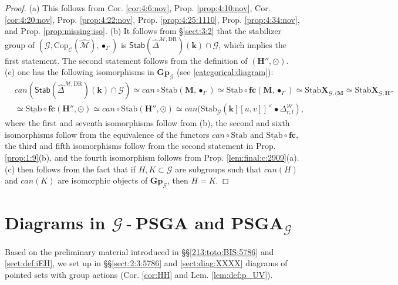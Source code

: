 \documentclass[10pt]{amsart}
\newcommand{\DR}{\mathrm{DR}}
\numberwithin{equation}{subsection}
\begin{document}
\begin{proof}
(a) This follows from Cor. \ref{cor:4:6:nov}, Prop. \ref{prop:4:10:nov}, Cor. \ref{cor:4:20:nov}, Prop. \ref{prop:4:22:nov}, Prop. \ref{prop:4:25:1110},
Prop. \ref{prop:4:34:nov}, and Prop. \ref{prop:missing:iso}. 
(b) It follows from §\ref{sect:3:2} that the stabilizer group of
$(\mathcal G,\mathrm{Cop}_{\mathcal C}(\hat{\mathcal M}),\bullet_\Gamma)$
is $\mathsf{Stab}(\hat\Delta^{\mathcal M,\DR})(\mathbf k)\cap \mathcal G$, which implies the first statement. The second 
statement follows from the definition of $(\mathbf{H''},\odot)$.      
(c) one has the following isomorphisms in $\mathbf{Gp}_{\mathcal G}$ (see \eqref{categorical:diagram}): 
\begin{align*}
    &
can(\mathsf{Stab}(\hat\Delta^{\mathcal M,\DR})(\mathbf k)\cap \mathcal G)
\simeq can\circ \mathrm{Stab}(\mathbf M,\bullet_\Gamma)\simeq
\underline{\mathrm{Stab}}\circ\mathbf f\mathbf c(\mathbf M,\bullet_\Gamma)
\simeq\underline{\mathrm{Stab}}\mathbf X_{\mathcal G,(\mathbf M}
\simeq \underline{\mathrm{Stab}}\mathbf X_{\mathcal G,\mathbf{H''}}
    \\&
\simeq \underline{\mathrm{Stab}}\circ\mathbf f\mathbf c(\mathbf{H''},\odot)    
\simeq can \circ \mathrm{Stab}(\mathbf{H''},\odot)\simeq can(\mathrm{Stab}_{\mathcal G}(
\mathbf k[[u,v]]^\times\bullet\Delta^{\mathcal W}_{r,l}
), 
\end{align*}
where the first and seventh isomorphisms follow from (b), the second and sixth isomorphisms follow from 
the equivalence of the functors $can\circ \mathrm{Stab}$ and 
$\underline{\mathrm{Stab}}\circ \mathbf f\mathbf c$, the third and fifth isomorphisms follow from the second statement in Prop. \ref{prop:1:9}(b), 
and the fourth isomorphism follows from Prop. \ref{lem:final:c:2909}(a). (c) then follows from the
fact that if $H,K\subset\mathcal G$ are subgroups such that $can(H)$ and $can(K)$ are isomorphic
objects of $\mathbf{Gp}_{\mathcal G}$, then $H=K$. 
\end{proof}

\section{Diagrams in $\mathcal G\operatorname{-}\mathbf{PSGA}$ and $\mathbf{PSGA}_{\mathcal G}$}
\label{sect:2}

Based on the preliminary material introduced in §§\ref{213:toto:BIS:5786} and \ref{sect:def:iEH}, we set up in 
§§\ref{sect:2:3:5786} and \ref{sect:diag:XXXX} diagrams of pointed sets with group actions (Cor. \ref{cor:HH} 
and Lem. \ref{lem:def:p_UV}).
\end{document}
